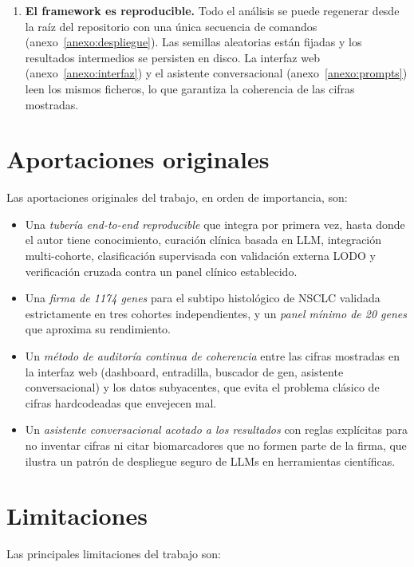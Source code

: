 \begin{enumerate}
  \item \textbf{El framework es reproducible.} Todo el análisis se
  puede regenerar desde la raíz del repositorio con una única secuencia
  de comandos (anexo~\ref{anexo:despliegue}). Las semillas aleatorias
  están fijadas y los resultados intermedios se persisten en disco. La
  interfaz web (anexo~\ref{anexo:interfaz}) y el asistente
  conversacional (anexo~\ref{anexo:prompts}) leen los mismos ficheros,
  lo que garantiza la coherencia de las cifras mostradas.
\end{enumerate}

\section{Aportaciones originales}
\label{sec:conc_aportaciones}

Las aportaciones originales del trabajo, en orden de importancia, son:

\begin{itemize}
  \item Una \emph{tubería end-to-end reproducible} que integra por primera
  vez, hasta donde el autor tiene conocimiento, curación clínica basada
  en LLM, integración multi-cohorte, clasificación supervisada con
  validación externa LODO y verificación cruzada contra un panel clínico
  establecido.
  \item Una \emph{firma de 1174 genes} para el subtipo histológico de
  NSCLC validada estrictamente en tres cohortes independientes, y un
  \emph{panel mínimo de 20 genes} que aproxima su rendimiento.
  \item Un \emph{método de auditoría continua de coherencia} entre las
  cifras mostradas en la interfaz web (dashboard, entradilla, buscador de
  gen, asistente conversacional) y los datos subyacentes, que evita el
  problema clásico de cifras hardcodeadas que envejecen mal.
  \item Un \emph{asistente conversacional acotado a los resultados} con
  reglas explícitas para no inventar cifras ni citar biomarcadores que
  no formen parte de la firma, que ilustra un patrón de despliegue seguro
  de LLMs en herramientas científicas.
\end{itemize}

\section{Limitaciones}
\label{sec:conc_limitaciones}

Las principales limitaciones del trabajo son:

